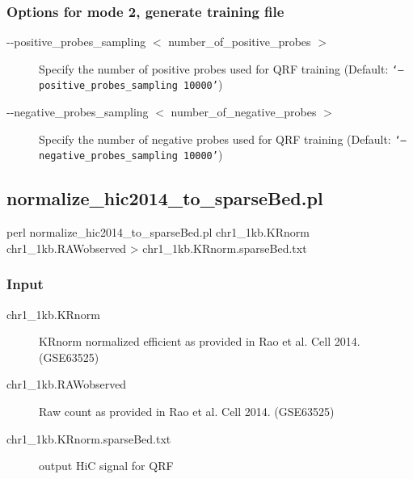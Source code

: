 \documentclass[12pt]{article}
\begin{document}
{\color{blue}\subsubsection{Options for mode 2, generate training file}}
\begin{description}
\item[-{}-positive\_probes\_sampling \begin{math}<\end{math} number\_of\_positive\_probes \begin{math}>\end{math}]  Specify the number of positive probes used for QRF training (Default: {\tt `--positive\_probes\_sampling 10000'})
\item[-{}-negative\_probes\_sampling \begin{math}<\end{math} number\_of\_negative\_probes \begin{math}>\end{math}]  Specify the number of negative probes used for QRF training (Default: {\tt `--negative\_probes\_sampling 10000'})

\end{description}

{\color{blue}\subsection{normalize\_hic2014\_to\_sparseBed.pl}}
 \begin{verbatimtab}
perl normalize_hic2014_to_sparseBed.pl  chr1_1kb.KRnorm chr1_1kb.RAWobserved > chr1_1kb.KRnorm.sparseBed.txt
\end{verbatimtab}

{\color{blue}\subsubsection{Input}}
\begin{description}
\item[chr1\_1kb.KRnorm] KRnorm normalized efficient as provided in Rao et al. Cell 2014. (GSE63525)
\item[chr1\_1kb.RAWobserved] Raw count as provided in Rao et al. Cell 2014. (GSE63525)
\item[chr1\_1kb.KRnorm.sparseBed.txt] output HiC signal for QRF

\end{description}
\end{document}
